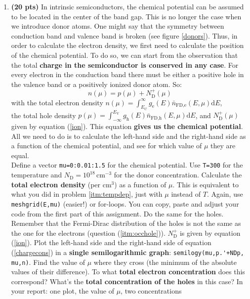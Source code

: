 \documentclass[11pt]{article}
\begin{document}
\begin{enumerate}[resume]
\item \textbf{(20 pts)} In intrinsic semiconductors, the chemical potential can be assumed to be located in the center of the band gap. This is no longer the case when we introduce donor atoms. One might say that the symmetry between conduction band and valence band is broken (see figure \ref{donors}). Thus, in order to calculate the electron density, we first need to calculate the position of the chemical potential. To do so, we can start from the observation that the total {\bf charge in the semiconductor is conserved in any case}. For every electron in the conduction band there must be either a positive hole in the valence band or a positively ionized donor atom. So:
\begin{equation}\label{chargecons}n(\mu)=p(\mu)+N_\text{D}^+(\mu)\end{equation}
with the total electron density $n(\mu)=\int_{E_\text{C}}^\infty g_\text{e}(E) \bar {n}_\text{FD,e}(E,\mu) \text{d}E$,\\ the total hole density $p(\mu)=\int_{-\infty}^{E_\text{V}} g_\text{h}(E) \bar {n}_\text{FD,h}(E,\mu) \text{d}E$, and $N_\text{D}^+(\mu)$ given by equation (\ref{ion}). This equation {\bf gives us the chemical potential}. All we need to do is to calculate the left-hand side and the right-hand side as a function of the chemical potential, and see for which value of $\mu$ they are equal.\\
Define a vector \verb|mu=0:0.01:1.5| for the chemical potential. Use \verb|T=300| for the temperature and $N_\text{D}=10^{18}\,\mathrm{cm^{-3}}$ for the donor concentration. Calculate the {\bf total electron density} (per  $\mathrm{cm^3}$) as a function of $\mu$. This is equivalent to what you did in problem \ref{itm:tempdep}, just with $\mu$ instead of $T$. Again, use \verb|meshgrid(E,mu)| (easier!) or for-loops. You can copy, paste and adjust your code from the first part of this assignment. Do the same for the holes. Remember that the Fermi-Dirac distribution of the holes is not the same as the one for the electrons (question (\ref{itm:occhole})). $N_\text{D}^+$ is given by equation (\ref{ion}). Plot the left-hand side and the right-hand side of equation (\ref{chargecons}) in a {\bf single semilogarithmic graph}: \verb|semilogy(mu,p.'+NDp, mu,n)|. Find the value of $\mu$ where they cross (the minimum of the absolute values of their difference). To what {\bf total electron concentration} does this correspond? What's the {\bf total concentration of the holes} in this case?  {\color{red}In your report: one plot, the value of $\mu$, two concentrations}


\end{enumerate}
\end{document}
